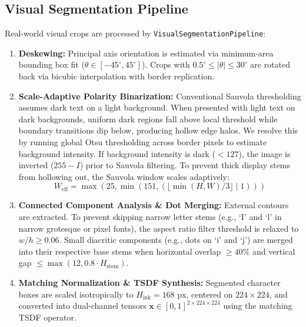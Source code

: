 \documentclass[10pt,twocolumn,letterpaper]{article}
\begin{document}
\subsection{Visual Segmentation Pipeline}
Real-world visual crops are processed by \texttt{VisualSegmentationPipeline}:
\begin{enumerate}
    \item \textbf{Deskewing:} Principal axis orientation is estimated via minimum-area bounding box fit ($\theta \in [-45^\circ, 45^\circ]$). Crops with $0.5^\circ \le |\theta| \le 30^\circ$ are rotated back via bicubic interpolation with border replication.
    \item \textbf{Scale-Adaptive Polarity Binarization:} Conventional Sauvola thresholding assumes dark text on a light background. When presented with light text on dark backgrounds, uniform dark regions fall above local threshold while boundary transitions dip below, producing hollow edge halos. We resolve this by running global Otsu thresholding across border pixels to estimate background intensity. If background intensity is dark ($< 127$), the image is inverted ($255 - I$) prior to Sauvola filtering. To prevent thick display stems from hollowing out, the Sauvola window scales adaptively:
    \begin{equation}
        W_{\text{eff}} = \max\left(25, \min\left(151, \left(\lfloor \min(H, W) / 3 \rfloor \mid 1\right)\right)\right)
    \end{equation}
    \item \textbf{Connected Component Analysis \& Dot Merging:} External contours are extracted. To prevent skipping narrow letter stems (e.g., `I' and `l' in narrow grotesque or pixel fonts), the aspect ratio filter threshold is relaxed to $w/h \ge 0.06$. Small diacritic components (e.g., dots on `i' and `j') are merged into their respective base stems when horizontal overlap $\ge 40\%$ and vertical gap $\le \max(12, 0.8 \cdot H_{\text{stem}})$.
    \item \textbf{Matching Normalization \& TSDF Synthesis:} Segmented character boxes are scaled isotropically to $H_{\text{ink}} = 168\text{ px}$, centered on $224 \times 224$, and converted into dual-channel tensors $\mathbf{x} \in [0, 1]^{2 \times 224 \times 224}$ using the matching TSDF operator.
\end{enumerate}
\end{document}
